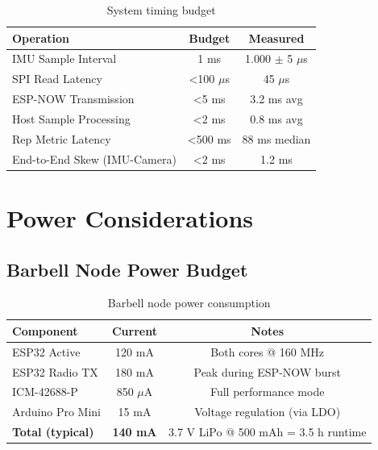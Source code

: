 \begin{table}[h]
    \centering
    \caption{System timing budget}
    \label{tab:timing_budget}
    \begin{tabular}{lcc}
        \toprule
        \textbf{Operation} & \textbf{Budget} & \textbf{Measured} \\
        \midrule
        IMU Sample Interval & 1 ms & 1.000 $\pm$ 5 $\mu$s \\
        SPI Read Latency & \textless 100 $\mu$s & 45 $\mu$s \\
        ESP-NOW Transmission & \textless 5 ms & 3.2 ms avg \\
        Host Sample Processing & \textless 2 ms & 0.8 ms avg \\
        Rep Metric Latency & \textless 500 ms & 88 ms median \\
        End-to-End Skew (IMU-Camera) & \textless 2 ms & 1.2 ms \\
        \bottomrule
    \end{tabular}
\end{table}

\section{Power Considerations}

\subsection{Barbell Node Power Budget}

\begin{table}[h]
    \centering
    \caption{Barbell node power consumption}
    \label{tab:power_budget}
    \begin{tabular}{lcc}
        \toprule
        \textbf{Component} & \textbf{Current} & \textbf{Notes} \\
        \midrule
        ESP32 Active & 120 mA & Both cores @ 160 MHz \\
        ESP32 Radio TX & 180 mA & Peak during ESP-NOW burst \\
        ICM-42688-P & 850 $\mu$A & Full performance mode \\
        Arduino Pro Mini & 15 mA & Voltage regulation (via LDO) \\
        \midrule
        \textbf{Total (typical)} & \textbf{140 mA} & 3.7 V LiPo @ 500 mAh = 3.5 h runtime \\
        \bottomrule
    \end{tabular}
\end{table}

